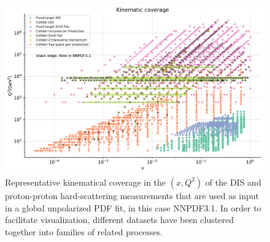 \begin{figure}[t]
\begin{center}
  \includegraphics[scale=0.60]{plots/kinplot-report.pdf}
  \caption{\small Representative kinematical coverage in the
    $(x,Q^2)$ of the DIS and proton-proton hard-scattering measurements that are
    used as input in a global unpolarized PDF fit, in this case NNPDF3.1.
    In order to facilitate visualization, different
    datasets have been clustered together into families of
    related processes.
    \label{fig:kinplot-report} 
  }
\end{center}
\end{figure}

